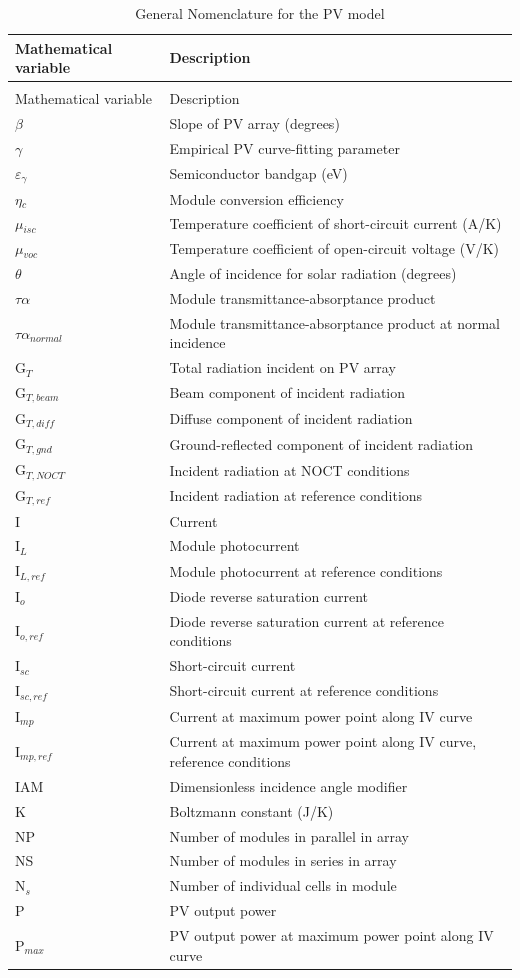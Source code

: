 \begin{longtable}[l]{p{1.2in}p{4.8in}}
\caption{General Nomenclature for the PV model \label{table:general-nomenclature-for-the-pv-model}} \tabularnewline
\toprule
Mathematical variable & Description \tabularnewline
\midrule
\endfirsthead

\caption[]{General Nomenclature for the PV model} \tabularnewline
\toprule
Mathematical variable & Description \tabularnewline
\midrule
\endhead

$\beta$ & Slope of PV array (degrees) \tabularnewline
$\gamma$ & Empirical PV curve-fitting parameter \tabularnewline
$\varepsilon$\(_{\gamma}\) & Semiconductor bandgap (eV) \tabularnewline
$\eta$\(_{c}\) & Module conversion efficiency \tabularnewline
$\mu$\(_{isc}\) & Temperature coefficient of short-circuit current (A/K) \tabularnewline
$\mu$\(_{voc}\) & Temperature coefficient of open-circuit voltage (V/K) \tabularnewline
$\theta$ & Angle of incidence for solar radiation (degrees) \tabularnewline
$\tau\alpha$ & Module transmittance-absorptance product \tabularnewline
$\tau\alpha$\(_{normal}\) & Module transmittance-absorptance product at normal incidence \tabularnewline
G\(_{T}\) & Total radiation incident on PV array \tabularnewline
G\(_{T,beam}\) & Beam component of incident radiation \tabularnewline
G\(_{T,diff}\) & Diffuse component of incident radiation \tabularnewline
G\(_{T,gnd}\) & Ground-reflected component of incident radiation \tabularnewline
G\(_{T,NOCT}\) & Incident radiation at NOCT conditions \tabularnewline
G\(_{T,ref}\) & Incident radiation at reference conditions \tabularnewline
I & Current \tabularnewline
I\(_{L}\) & Module photocurrent \tabularnewline
I\(_{L,ref}\) & Module photocurrent at reference conditions \tabularnewline
I\(_{o}\) & Diode reverse saturation current \tabularnewline
I\(_{o,ref}\) & Diode reverse saturation current at reference conditions \tabularnewline
I\(_{sc}\) & Short-circuit current \tabularnewline
I\(_{sc,ref}\) & Short-circuit current at reference conditions \tabularnewline
I\(_{mp}\) & Current at maximum power point along IV curve \tabularnewline
I\(_{mp,ref}\) & Current at maximum power point along IV curve, reference conditions \tabularnewline
IAM & Dimensionless incidence angle modifier \tabularnewline
K & Boltzmann constant (J/K) \tabularnewline
NP & Number of modules in parallel in array \tabularnewline
NS & Number of modules in series in array \tabularnewline
N\(_{s}\) & Number of individual cells in module \tabularnewline
P & PV output power \tabularnewline
P\(_{max}\) & PV output power at maximum power point along IV curve \tabularnewline

\end{longtable}
